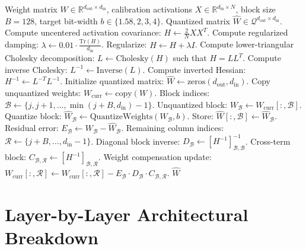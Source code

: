 \documentclass[10pt,twocolumn,letterpaper]{article}
\newcommand{\R}{\mathbb{R}}
\begin{document}
\begin{algorithm}[h]
\caption{Block-Cholesky Hessian Weight Quantization}
\label{alg:cholesky_quant}
\small
\begin{algorithmic}[1]
\Require Weight matrix $W \in \R^{d_{\text{out}} \times d_{\text{in}}}$, calibration activations $X \in \R^{d_{\text{in}} \times N}$, block size $B = 128$, target bit-width $b \in \{1.58, 2, 3, 4\}$.
\Ensure Quantized matrix $\widehat{W} \in \mathcal{Q}^{d_{\text{out}} \times d_{\text{in}}}$.
\State Compute uncentered activation covariance: $H \gets \frac{2}{N} X X^T$.
\State Compute regularized damping: $\lambda \gets 0.01 \cdot \frac{\text{Tr}(H)}{d_{\text{in}}}$.
\State Regularize: $H \gets H + \lambda I$.
\State Compute lower-triangular Cholesky decomposition: $L \gets \text{Cholesky}(H)$ such that $H = L L^T$.
\State Compute inverse Cholesky: $L^{-1} \gets \text{Inverse}(L)$.
\State Compute inverted Hessian: $H^{-1} \gets L^{-T} L^{-1}$.
\State Initialize quantized matrix: $\widehat{W} \gets \text{zeros}(d_{\text{out}}, d_{\text{in}})$.
\State Copy unquantized weights: $W_{\text{curr}} \gets \text{copy}(W)$.
    \State Block indices: $\mathcal{B} \gets \{j, j+1, \dots, \min(j+B, d_{\text{in}})-1\}$.
    \State Unquantized block: $W_{\mathcal{B}} \gets W_{\text{curr}}[:, \mathcal{B}]$.
    \State Quantize block: $\widehat{W}_{\mathcal{B}} \gets \text{QuantizeWeights}(W_{\mathcal{B}}, b)$.
    \State Store: $\widehat{W}[:, \mathcal{B}] \gets \widehat{W}_{\mathcal{B}}$.
    \State Residual error: $E_{\mathcal{B}} \gets W_{\mathcal{B}} - \widehat{W}_{\mathcal{B}}$.
    \State Remaining column indices: $\mathcal{R} \gets \{j+B, \dots, d_{\text{in}}-1\}$.
        \State Diagonal block inverse: $D_{\mathcal{B}} \gets [H^{-1}]_{\mathcal{B}, \mathcal{B}}^{-1}$.
        \State Cross-term block: $C_{\mathcal{B}, \mathcal{R}} \gets [H^{-1}]_{\mathcal{B}, \mathcal{R}}$.
        \State Weight compensation update:
        \State $W_{\text{curr}}[:, \mathcal{R}] \gets W_{\text{curr}}[:, \mathcal{R}] - E_{\mathcal{B}} \cdot D_{\mathcal{B}} \cdot C_{\mathcal{B}, \mathcal{R}}$.
    \EndIf
\EndFor
\State \Return $\widehat{W}$
\end{algorithmic}
\end{algorithm}

\section{Layer-by-Layer Architectural Breakdown}
\label{app:layer_table}
\end{document}
